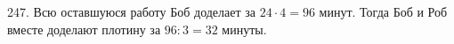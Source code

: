 247. Всю оставшуюся работу Боб доделает за $24\cdot4=96$ минут. Тогда Боб и Роб вместе доделают плотину за $96:3=32$ минуты.\\
